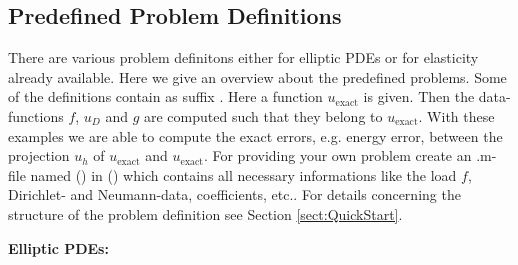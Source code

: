\subsection{Predefined Problem Definitions}
\label{sect:ImplementedProblems_ProblemDefinition}

There are various problem definitons either for elliptic PDEs or for elasticity already available. Here we give an overview about the predefined problems. Some of the definitions contain as suffix . Here a function $u_{\text{exact}}$ is given. Then the data-functions $f$, $u_D$ and $g$ are computed such that they belong to $u_{\text{exact}}$. With these examples we are able to compute the exact errors, e.g. energy error, between the projection $u_h$ of $u_{\text{exact}}$ and $u_{\text{exact}}$. For providing your own problem create an .m-file named  () in  () which contains all necessary informations like the load $f$, Dirichlet- and Neumann-data, coefficients, etc.. For details concerning the structure of the problem definition see Section \ref{sect:QuickStart}. 

\bigskip

\textbf{Elliptic PDEs:}

\bigskip

